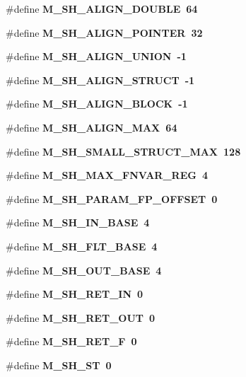 \begin{CompactItemize}
\#define \bf{M\_\-SH\_\-ALIGN\_\-DOUBLE}~64
\item 
\#define \bf{M\_\-SH\_\-ALIGN\_\-POINTER}~32
\item 
\#define \bf{M\_\-SH\_\-ALIGN\_\-UNION}~-1
\item 
\#define \bf{M\_\-SH\_\-ALIGN\_\-STRUCT}~-1
\item 
\#define \bf{M\_\-SH\_\-ALIGN\_\-BLOCK}~-1
\item 
\#define \bf{M\_\-SH\_\-ALIGN\_\-MAX}~64
\item 
\#define \bf{M\_\-SH\_\-SMALL\_\-STRUCT\_\-MAX}~128
\item 
\#define \bf{M\_\-SH\_\-MAX\_\-FNVAR\_\-REG}~4
\item 
\#define \bf{M\_\-SH\_\-PARAM\_\-FP\_\-OFFSET}~0
\item 
\#define \bf{M\_\-SH\_\-IN\_\-BASE}~4
\item 
\#define \bf{M\_\-SH\_\-FLT\_\-BASE}~4
\item 
\#define \bf{M\_\-SH\_\-OUT\_\-BASE}~4
\item 
\#define \bf{M\_\-SH\_\-RET\_\-IN}~0
\item 
\#define \bf{M\_\-SH\_\-RET\_\-OUT}~0
\item 
\#define \bf{M\_\-SH\_\-RET\_\-F}~0
\item 
\#define \bf{M\_\-SH\_\-ST}~0
\end{CompactItemize}

